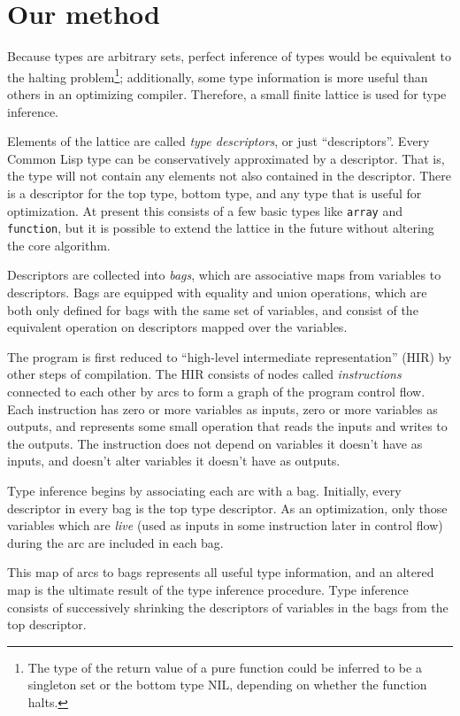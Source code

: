 \section{Our method}

Because \commonlisp{} types are arbitrary sets, perfect inference of \commonlisp{} types would be equivalent to the halting problem\footnote{The type of the return value of a pure function could be inferred to be a singleton set or the bottom type NIL, depending on whether the function halts.}; additionally, some type information is more useful than others in an optimizing compiler. Therefore, a small finite lattice is used for type inference.

Elements of the lattice are called \textit{type descriptors}, or just ``descriptors''. Every Common Lisp type can be conservatively approximated by a descriptor. That is, the type will not contain any elements not also contained in the descriptor. There is a descriptor for the top type, bottom type, and any type that is useful for optimization. At present this consists of a few basic types like \texttt{array} and \texttt{function}, but it is possible to extend the lattice in the future without altering the core algorithm.

Descriptors are collected into \textit{bags}, which are associative maps from variables to descriptors. Bags are equipped with equality and union operations, which are both only defined for bags with the same set of variables, and consist of the equivalent operation on descriptors mapped over the variables.

The program is first reduced to ``high-level intermediate representation'' (HIR) by other steps of compilation. The HIR consists of nodes called \textit{instructions} connected to each other by arcs to form a graph of the program control flow. Each instruction has zero or more variables as inputs, zero or more variables as outputs, and represents some small operation that reads the inputs and writes to the outputs. The instruction does not depend on variables it doesn't have as inputs, and doesn't alter variables it doesn't have as outputs.

Type inference begins by associating each arc with a bag. Initially, every descriptor in every bag is the top type descriptor. As an optimization, only those variables which are \textit{live} (used as inputs in some instruction later in control flow) during the arc are included in each bag.

This map of arcs to bags represents all useful type information, and an altered map is the ultimate result of the type inference procedure. Type inference consists of successively shrinking the descriptors of variables in the bags from the top descriptor.


